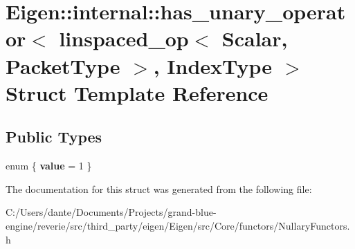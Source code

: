 \hypertarget{struct_eigen_1_1internal_1_1has__unary__operator_3_01linspaced__op_3_01_scalar_00_01_packet_type_01_4_00_01_index_type_01_4}{}\section{Eigen\+::internal\+::has\+\_\+unary\+\_\+operator$<$ linspaced\+\_\+op$<$ Scalar, Packet\+Type $>$, Index\+Type $>$ Struct Template Reference}
\label{struct_eigen_1_1internal_1_1has__unary__operator_3_01linspaced__op_3_01_scalar_00_01_packet_type_01_4_00_01_index_type_01_4}
\subsection*{Public Types}
\begin{DoxyCompactItemize}
\item 
\mbox{\label{struct_eigen_1_1internal_1_1has__unary__operator_3_01linspaced__op_3_01_scalar_00_01_packet_type_01_4_00_01_index_type_01_4_a84c5f30dcb7dc294f3ea641e12186e91}} 
enum \{ {\bfseries value} = 1
 \}
\end{DoxyCompactItemize}


The documentation for this struct was generated from the following file\+:\begin{DoxyCompactItemize}
\item 
C\+:/\+Users/dante/\+Documents/\+Projects/grand-\/blue-\/engine/reverie/src/third\+\_\+party/eigen/\+Eigen/src/\+Core/functors/Nullary\+Functors.\+h\end{DoxyCompactItemize}
